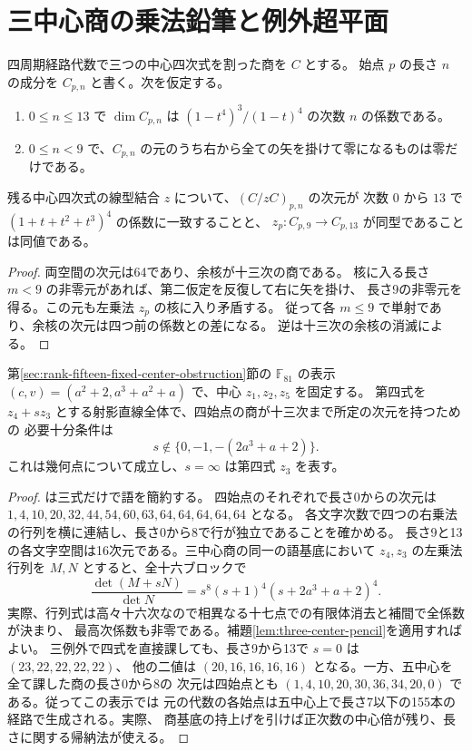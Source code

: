 \section{三中心商の乗法鉛筆と例外超平面}
\label{sec:three-center-pencil}

\begin{lemma}\label{lem:three-center-pencil}
四周期経路代数で三つの中心四次式を割った商を $C$ とする。
始点 $p$ の長さ $n$ の成分を $C_{p,n}$ と書く。次を仮定する。
\begin{enumerate}
\item $0\le n\le13$ で $\dim C_{p,n}$ は $(1-t^4)^3/(1-t)^4$ の次数 $n$ の係数である。
\item $0\le n<9$ で、$C_{p,n}$ の元のうち右から全ての矢を掛けて零になるものは零だけである。
\end{enumerate}
残る中心四次式の線型結合 $z$ について、$(C/zC)_{p,n}$ の次元が
次数 $0$ から $13$ で $(1+t+t^2+t^3)^4$ の係数に一致することと、
$z_p:C_{p,9}\longrightarrow C_{p,13}$ が同型であることは同値である。
\end{lemma}
\begin{proof}
両空間の次元は64であり、余核が十三次の商である。
核に入る長さ $m<9$ の非零元があれば、第二仮定を反復して右に矢を掛け、
長さ9の非零元を得る。この元も左乗法 $z_p$ の核に入り矛盾する。
従って各 $m\le9$ で単射であり、余核の次元は四つ前の係数との差になる。
逆は十三次の余核の消滅による。
\end{proof}

\begin{proposition}\label{prop:f81-center-pencil}
第\ref{sec:rank-fifteen-fixed-center-obstruction}節の $\mathbb F_{81}$ の表示
$(c,v)=(a^2+2,a^3+a^2+a)$ で、中心 $z_1,z_2,z_5$ を固定する。
第四式を $z_4+s z_3$ とする射影直線全体で、四始点の商が十三次まで所定の次元を持つための
必要十分条件は
\[
       s\notin\{0,-1,-(2a^3+a+2)\}.
\]
これは幾何点について成立し、$s=\infty$ は第四式 $z_3$ を表す。
\end{proposition}
\begin{proof}
 は三式だけで語を簡約する。
四始点のそれぞれで長さ0からの次元は
$1,4,10,20,32,44,54,60,63,64,64,64,64,64$ となる。
各文字次数で四つの右乗法の行列を横に連結し、長さ0から8で行が独立であることを確かめる。
長さ9と13の各文字空間は16次元である。三中心商の同一の語基底において
$z_4,z_3$ の左乗法行列を $M,N$ とすると、全十六ブロックで
\[
 \frac{\det(M+sN)}{\det N}=s^8(s+1)^4(s+2a^3+a+2)^4 .
\]
実際、行列式は高々十六次なので相異なる十七点での有限体消去と補間で全係数が決まり、
最高次係数も非零である。補題\ref{lem:three-center-pencil}を適用すればよい。
三例外で四式を直接課しても、長さ9から13で $s=0$ は $(23,22,22,22,22)$、
他の二値は $(20,16,16,16,16)$ となる。一方、五中心を全て課した商の長さ0から8の
次元は四始点とも $(1,4,10,20,30,36,34,20,0)$ である。従ってこの表示では
元の代数の各始点は五中心上で長さ7以下の155本の経路で生成される。実際、
商基底の持上げを引けば正次数の中心倍が残り、長さに関する帰納法が使える。
\end{proof}

